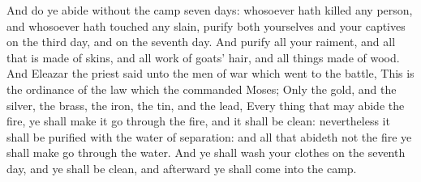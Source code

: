 \begin{biblechapter}
\verse And do ye abide without the camp seven days: whosoever hath killed any person, and whosoever hath touched any slain, purify both yourselves and your captives on the third day, and on the seventh day.
\verse And purify all your raiment, and all that is made of skins, and all work of goats' hair, and all things made of wood.
\verse And Eleazar the priest said unto the men of war which went to the battle, This is the ordinance of the law which the \LORD commanded Moses;
\verse Only the gold, and the silver, the brass, the iron, the tin, and the lead,
\verse Every thing that may abide the fire, ye shall make it go through the fire, and it shall be clean: nevertheless it shall be purified with the water of separation: and all that abideth not the fire ye shall make go through the water.
\verse And ye shall wash your clothes on the seventh day, and ye shall be clean, and afterward ye shall come into the camp.

\end{biblechapter}
